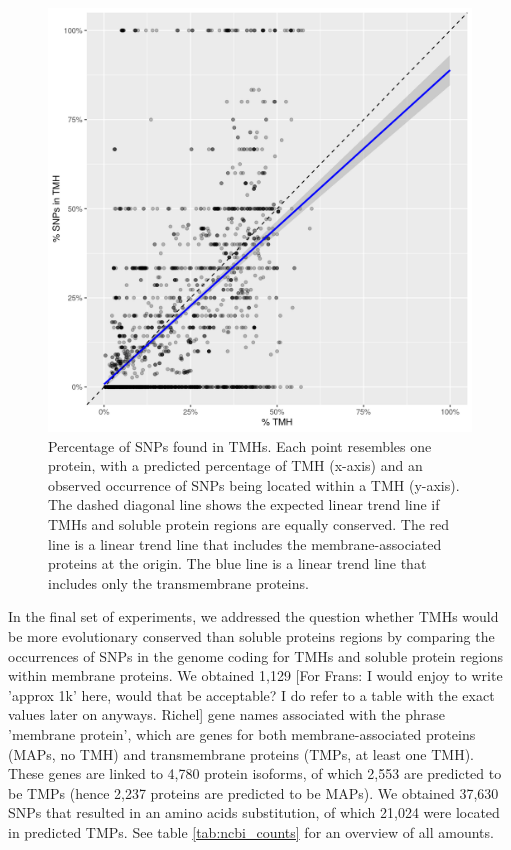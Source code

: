\begin{figure}[!htbp]
  \includegraphics[width=\textwidth]{ncbi_peregrine_results/fig_f_snps_found_and_expected.png}
  \caption{
    Percentage of SNPs found in TMHs.
    Each point resembles one protein, with a predicted percentage of
    TMH (x-axis) and an observed occurrence of SNPs being located
    within a TMH (y-axis).
    The dashed diagonal line shows the expected linear trend line
    if TMHs and soluble protein regions are equally conserved.
    The red line is a linear trend line that includes the membrane-associated
    proteins at the origin. 
    The blue line is a linear trend line that includes only the
    transmembrane proteins.
  }
  \label{fig:f_snps_found_and_expected}
\end{figure}

In the final set of experiments, 
we addressed the question whether TMHs 
would be more evolutionary conserved than soluble proteins regions 
by comparing the occurrences of SNPs in the genome coding 
for TMHs and soluble protein regions within membrane proteins.
We obtained 1,129 [For Frans: I would enjoy to write 'approx 1k' here, would that
be acceptable? I do refer to a table with the exact values
later on anyways. Richel] gene names associated with the phrase 'membrane protein',
which are genes for both membrane-associated proteins (MAPs, no TMH) and 
transmembrane proteins (TMPs, at least one TMH).
These genes are linked to 4,780 protein isoforms, 
of which 2,553 are predicted to be TMPs (hence 
2,237 proteins are predicted to be MAPs).
We obtained 37,630 SNPs that resulted in an
amino acids substitution, of which 21,024 were located 
in predicted TMPs.
See table \ref{tab:ncbi_counts} for an overview of all amounts.

